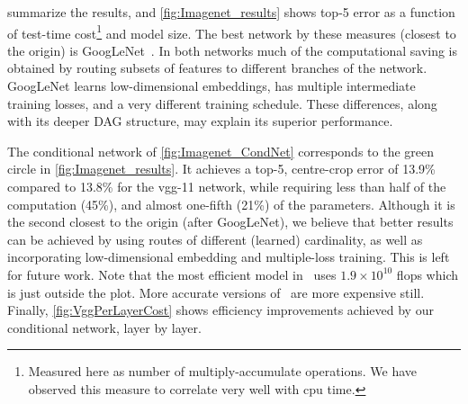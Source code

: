 \documentclass[thesis]{subfiles}
\begin{document}
	 summarize the results, and \cref{fig:Imagenet_results} shows top-5 error as a function of test-time cost\footnote{Measured here as number of multiply-accumulate operations. We have observed this measure to correlate very well with \gls{cpu} time.} and model size. The best network by these measures (\ie closest to the origin) is GoogLeNet~\citep{Szegedy2014going}. In both networks much of the computational saving is obtained by routing subsets of features to different branches of the network. GoogLeNet learns low-dimensional embeddings, has multiple intermediate training losses, and a very different training schedule. These differences, along with its deeper DAG structure, may explain its superior performance.
	
	The conditional network of \cref{fig:Imagenet_CondNet} 
	corresponds to the green circle in \cref{fig:Imagenet_results}.
	It achieves a top-5, centre-crop error of
	13.9\% compared to 13.8\% for the \gls{vgg}-11 network, while requiring less than half of the computation (45\%),
	and almost one-fifth (21\%) of the parameters.
	Although it is the second closest to the origin (after GoogLeNet), we believe that better results can be achieved 
	by using routes of different (learned) cardinality, as well as incorporating low-dimensional embedding and multiple-loss training. This is left for future work. 
	Note that the most efficient model in~\citep{He2015b} uses \(1.9\times 10^{10}\) flops which is just outside the plot. 
	More accurate versions of~\citep{He2015b} are more expensive still.
	Finally, \cref{fig:VggPerLayerCost} shows efficiency improvements achieved by our conditional network, layer by layer.
	
\end{document}
